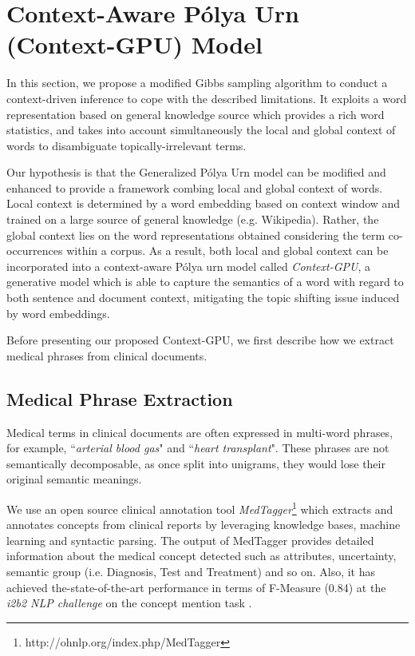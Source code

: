 \documentclass[letterpaper]{article}
\begin{document}
\section{Context-Aware P\'{o}lya Urn  (Context-GPU) Model}

In this section, we propose a modified Gibbs sampling algorithm to conduct a context-driven inference to cope with the described limitations. It exploits a word representation based on general knowledge source which provides a rich word statistics, and takes into account simultaneously the local and global context of words to disambiguate topically-irrelevant terms. 

Our hypothesis is that the Generalized P\'{o}lya Urn model can be modified and enhanced to provide a framework combing local and global context of words. Local context is determined by a word embedding based on context window and trained on a large source of general knowledge (e.g. Wikipedia). 
Rather, the global context lies on the word representations obtained considering the term co-occurrences within a corpus. As a result, both local and global context can be incorporated into a context-aware P\'{o}lya urn model called \textit{Context-GPU}, a generative model which is able to capture the semantics of a word with regard to both sentence and document context, mitigating the topic shifting issue induced by word embeddings. %

Before presenting our proposed Context-GPU, we first describe how we extract medical phrases from clinical documents.



\subsection{Medical Phrase Extraction}

Medical terms in clinical documents are often expressed in multi-word phrases, for example, ``\textit{arterial blood gas}" and ``\textit{heart transplant}". These phrases are not semantically decomposable, as once split into unigrams, they would lose their original semantic meanings.

We use an open source clinical annotation tool \textit{MedTagger}\footnote{http://ohnlp.org/index.php/MedTagger} which extracts and annotates concepts from clinical reports by leveraging knowledge bases, machine learning and syntactic parsing. The output of MedTagger provides detailed information about the medical concept detected such as attributes, uncertainty, semantic group (i.e. Diagnosis, Test and Treatment) and so on. Also, it has achieved the-state-of-the-art performance in terms of F-Measure (0.84) at the \textit{i2b2 NLP challenge} on the concept mention task \cite{liu12}. 
\end{document}
